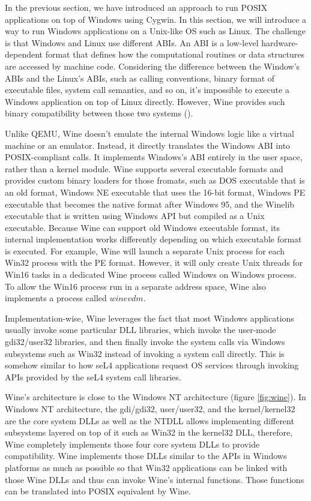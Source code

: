 In the previous section, we have introduced an approach to run POSIX applications on top of Windows using Cygwin. In this section, we will introduce a way to run Windows applications on a Unix-like OS such as Linux. The challenge is that Windows and Linux use different ABIs. An ABI is a low-level hardware-dependent format that defines how the computational routines or data structures are accessed by machine code. Considering the difference between the Window's ABIs and the Linux's ABIs, such as calling conventions, binary format of executable files, system call semantics, and so on, it's impossible to execute a Windows application on top of Linux directly. However, Wine provides such binary compatibility between those two systems (\cite{enwikiWine}).      

Unlike QEMU, Wine doesn't emulate the internal Windows logic like a virtual machine or an emulator. Instead, it directly translates the Windows ABI into POSIX-compliant calls. It implements Windows's ABI entirely in the user space, rather than a kernel module. Wine supports several executable formats and provides custom binary loaders for those fromats, such as DOS executable that is an old format, Windows NE executable that uses the 16-bit format, Windows PE executable that becomes the native format after Windows 95, and the Winelib executable that is written using Windows API but compiled as a Unix executable. Because Wine can support old Windows executable format, its internal implementation works differently depending on which executable format is executed. For example, Wine will launch a separate Unix process for each Win32 process with the PE format. However, it will only create Unix threads for Win16 tasks in a dedicated Wine process called Windows on Windows process. To allow the Win16 process run in a separate address space, Wine also implements a process called $winevdm$.  

Implementation-wise, Wine leverages the fact that most Windows applications usually invoke some particular DLL libraries, which invoke the user-mode gdi32/user32 libraries, and then finally invoke the system calls via Windows subsystems such as Win32 instead of invoking a system call directly. This is somehow similar to how seL4 applications request OS services through invoking APIs provided by the seL4 system call libraries. 

Wine's architecture is close to the Windows NT architecture (figure \ref{fig:wine}). In Windows NT architecture, the gdi/gdi32, user/user32, and the kernel/kernel32 are the core system DLLs as well as the NTDLL allows implementing different subsystems layered on top of it such as Win32 in the kernel32 DLL, therefore, Wine completely implements those four core system DLLs to provide compatibility. Wine implements those DLLs similar to the APIs in Windows platforms as much as possible so that Win32 applications can be linked with those Wine DLLs and thus can invoke Wine's internal functions. Those functions can be translated into POSIX equivalent by Wine.

